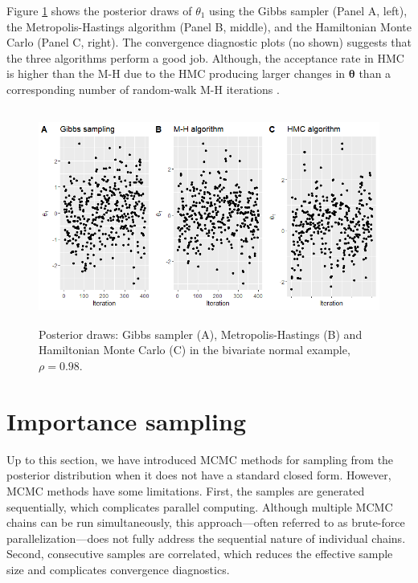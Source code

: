 Figure \ref{fig54} shows the posterior draws of $\theta_1$ using the Gibbs sampler (Panel A, left), the Metropolis-Hastings algorithm (Panel B, middle), and the Hamiltonian Monte Carlo (Panel C, right). The convergence diagnostic plots (no shown) suggests that the three algorithms perform a good job. Although, the acceptance rate in HMC is higher than the M-H due to the HMC producing larger changes in $\bm{\theta}$ than a corresponding number of random-walk M-H iterations \cite{neal2011mcmc}.

\begin{figure}[!h]
	\includegraphics[width=340pt, height=200pt]{Chapters/chapter5/figures/BivariateNormal.98}
	\caption[List of figure caption goes here]{Posterior draws: Gibbs sampler (A), Metropolis-Hastings (B) and Hamiltonian Monte Carlo (C) in the bivariate normal example, $\rho=0.98$.}\label{fig54}
\end{figure}       

\section{Importance sampling}\label{sec52}

Up to this section, we have introduced MCMC methods for sampling from the posterior distribution when it does not have a standard closed form. However, MCMC methods have some limitations. First, the samples are generated sequentially, which complicates parallel computing. Although multiple MCMC chains can be run simultaneously, this approach—often referred to as brute-force parallelization—does not fully address the sequential nature of individual chains. Second, consecutive samples are correlated, which reduces the effective sample size and complicates convergence diagnostics.

